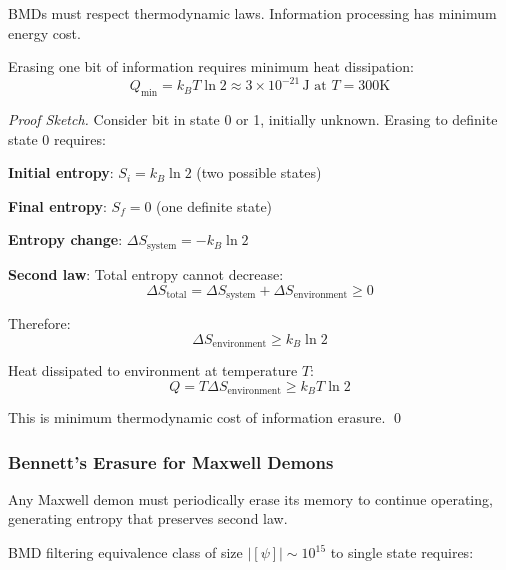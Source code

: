 \documentclass[11pt,onecolumn]{article}
\begin{document}
BMDs must respect thermodynamic laws. Information processing has minimum energy cost.

\begin{theorem}
\label{thm:landauer}
Erasing one bit of information requires minimum heat dissipation:
\begin{equation}
Q_{\text{min}} = k_B T \ln 2 \approx 3 \times 10^{-21}\,\text{J at } T=300\text{K}
\end{equation}
\end{theorem}

\begin{proof}[Proof Sketch]
Consider bit in state 0 or 1, initially unknown. Erasing to definite state 0 requires:

\textbf{Initial entropy}: $S_i = k_B \ln 2$ (two possible states)

\textbf{Final entropy}: $S_f = 0$ (one definite state)

\textbf{Entropy change}: $\Delta S_{\text{system}} = -k_B \ln 2$

\textbf{Second law}: Total entropy cannot decrease:
\begin{equation}
\Delta S_{\text{total}} = \Delta S_{\text{system}} + \Delta S_{\text{environment}} \geq 0
\end{equation}

Therefore:
\begin{equation}
\Delta S_{\text{environment}} \geq k_B \ln 2
\end{equation}

Heat dissipated to environment at temperature $T$:
\begin{equation}
Q = T \Delta S_{\text{environment}} \geq k_B T \ln 2
\end{equation}

This is minimum thermodynamic cost of information erasure. \qed
\end{proof}

\subsubsection{Bennett's Erasure for Maxwell Demons}

\begin{theorem}
Any Maxwell demon must periodically erase its memory to continue operating, generating entropy that preserves second law.
\end{theorem}

BMD filtering equivalence class of size $|[\psi]| \sim 10^{15}$ to single state requires:
\end{document}
